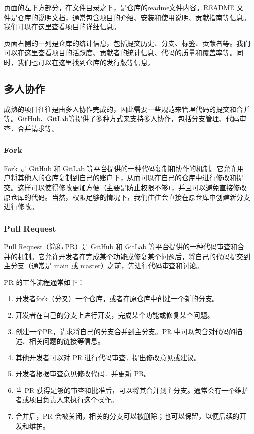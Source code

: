 \documentclass[../main.tex]{subfiles}
\begin{document}
页面的左下方部分，在文件目录之下，是仓库的readme文件内容。README 文件是仓库的说明文档，通常包含项目的介绍、安装和使用说明、贡献指南等信息。我们可以在这里查看项目的详细信息。

页面右侧的一列是仓库的统计信息，包括提交历史、分支、标签、贡献者等。我们可以在这里查看项目的活跃度、贡献者的统计信息、代码的质量和覆盖率等。同时，我们也可以在这里找到仓库的发行版等信息。

\subsection{多人协作}

成熟的项目往往是由多人协作完成的，因此需要一些规范来管理代码的提交和合并等。GitHub、GitLab等提供了多种方式来支持多人协作，包括分支管理、代码审查、合并请求等。

\subsubsection{Fork}

Fork 是 GitHub 和 GitLab 等平台提供的一种代码复制和协作的机制。它允许用户将其他人的仓库复制到自己的账户下，从而可以在自己的仓库中进行修改和提交。这样可以使得修改更加方便（主要是防止权限不够），并且可以避免直接修改原仓库的代码。当然，权限足够的情况下，我们往往会直接在原仓库中创建新分支进行修改。

\subsubsection{Pull Request}\label{sec:pull-request}
Pull Request（简称 PR）是 GitHub 和 GitLab 等平台提供的一种代码审查和合并的机制。它允许开发者在完成某个功能或修复某个问题后，将自己的代码提交到主分支（通常是 main 或 master）之前，先进行代码审查和讨论。

PR 的工作流程通常如下：

\begin{enumerate}
  \item 开发者fork（分叉）一个仓库，或者在原仓库中创建一个新的分支。
  \item 开发者在自己的分支上进行开发，完成某个功能或修复某个问题。
  \item 创建一个PR，请求将自己的分支合并到主分支。PR 中可以包含对代码的描述、相关问题的链接等信息。
  \item 其他开发者可以对 PR 进行代码审查，提出修改意见或建议。
  \item 开发者根据审查意见修改代码，并更新 PR。
  \item 当 PR 获得足够的审查和批准后，可以将其合并到主分支。通常会有一个维护者或项目负责人来执行这个操作。
  \item 合并后，PR 会被关闭，相关的分支可以被删除；也可以保留，以便后续的开发和维护。
\end{enumerate}
\end{document}
